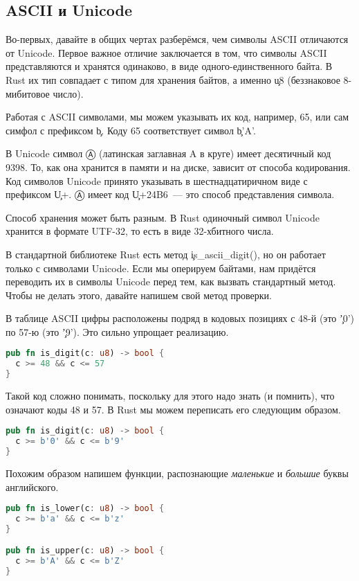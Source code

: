 \subsection{ASCII и Unicode}

Во-первых, давайте в общих чертах разберёмся, чем символы ASCII отличаются от Unicode.
Первое важное отличие заключается в том, что символы ASCII представляются и хранятся одинаково, в виде одного-единственного байта.
В Rust их тип совпадает с типом для хранения байтов, а именно \c{u8} (беззнаковое 8-мибитовое число).

Работая с ASCII символами, мы можем указывать их код, например, 65, или сам симфол с префиксом \c{b}.
Коду 65 соответствует символ \c{b'A'}.

В Unicode символ Ⓐ (латинская заглавная A в круге) имеет десятичный код 9398.
То, как она хранится в памяти и на диске, зависит от способа кодирования.
Код символов Unicode принято указывать в шестнадцатиричном виде с префиксом \c{U+}.
Ⓐ имеет код \c{U+24B6}~--- это способ представления символа.

Способ хранения может быть разным.
В Rust одиночный символ Unicode хранится в формате UTF-32, то есть в виде 32-хбитного числа.

В стандартной библиотеке Rust есть метод \c{is\_ascii\_digit()}, но он работает только с символами Unicode.
Если мы оперируем байтами, нам придётся переводить их в символы Unicode перед тем, как вызвать стандартный метод.
Чтобы не делать этого, давайте напишем свой метод проверки.

В таблице ASCII цифры расположены подряд в кодовых позициях с 48-й (это \c{'0'}) по 57-ю (это \c{'9'}).
Это сильно упрощает реализацию.

\begin{lstlisting}[language=Rust]
pub fn is_digit(c: u8) -> bool {
  c >= 48 && c <= 57
}
\end{lstlisting}

Такой код сложно понимать, поскольку для этого надо знать (и помнить), что означают коды 48 и 57.
В Rust мы можем переписать его следующим образом.

\begin{lstlisting}[language=Rust]
pub fn is_digit(c: u8) -> bool {
  c >= b'0' && c <= b'9'
}
\end{lstlisting}

Похожим образом напишем функции, распознающие {\em маленькие} и {\em большие} буквы английского.

\begin{lstlisting}[language=Rust]
pub fn is_lower(c: u8) -> bool {
  c >= b'a' && c <= b'z'
}

pub fn is_upper(c: u8) -> bool {
  c >= b'A' && c <= b'Z'
}
\end{lstlisting}

